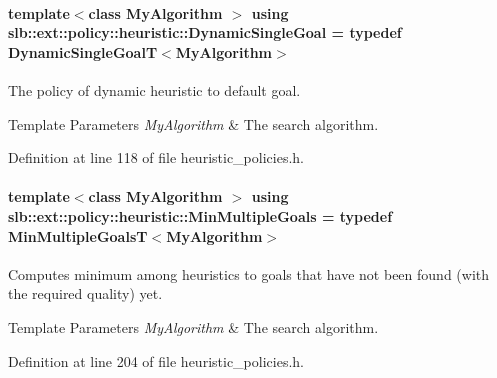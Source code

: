 \paragraph[{\texorpdfstring{Dynamic\+Single\+Goal}{DynamicSingleGoal}}]{\setlength{\rightskip}{0pt plus 5cm}template$<$class My\+Algorithm $>$ using {\bf slb\+::ext\+::policy\+::heuristic\+::\+Dynamic\+Single\+Goal} = typedef {\bf Dynamic\+Single\+GoalT}$<$My\+Algorithm$>$}\hypertarget{namespaceslb_1_1ext_1_1policy_1_1heuristic_abd4d8d1b33c56751ff726b83181b0609}{}\label{namespaceslb_1_1ext_1_1policy_1_1heuristic_abd4d8d1b33c56751ff726b83181b0609}


The policy of dynamic heuristic to default goal. 


\begin{DoxyTemplParams}{Template Parameters}
{\em My\+Algorithm} & The search algorithm. \\
\hline
\end{DoxyTemplParams}


Definition at line 118 of file heuristic\+\_\+policies.\+h.

\paragraph[{\texorpdfstring{Min\+Multiple\+Goals}{MinMultipleGoals}}]{\setlength{\rightskip}{0pt plus 5cm}template$<$class My\+Algorithm $>$ using {\bf slb\+::ext\+::policy\+::heuristic\+::\+Min\+Multiple\+Goals} = typedef {\bf Min\+Multiple\+GoalsT}$<$My\+Algorithm$>$}\hypertarget{namespaceslb_1_1ext_1_1policy_1_1heuristic_adb60983019024c0557fb57be8feab48c}{}\label{namespaceslb_1_1ext_1_1policy_1_1heuristic_adb60983019024c0557fb57be8feab48c}


Computes minimum among heuristics to goals that have not been found (with the required quality) yet. 


\begin{DoxyTemplParams}{Template Parameters}
{\em My\+Algorithm} & The search algorithm. \\
\hline
\end{DoxyTemplParams}


Definition at line 204 of file heuristic\+\_\+policies.\+h.

